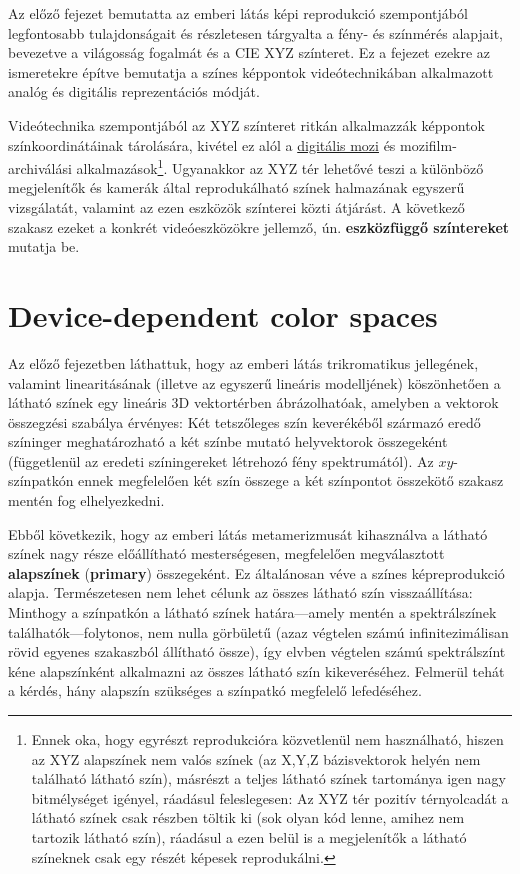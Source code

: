 Az előző fejezet bemutatta az emberi látás képi reprodukció szempontjából legfontosabb tulajdonságait és részletesen tárgyalta a fény- és színmérés alapjait, bevezetve a világosság fogalmát és a CIE XYZ színteret.
Ez a fejezet ezekre az ismeretekre építve bemutatja a színes képpontok videótechnikában alkalmazott analóg és digitális reprezentációs módját.

\vspace{3mm}
Videótechnika szempontjából az XYZ színteret ritkán alkalmazzák képpontok színkoordinátáinak tárolására, kivétel ez alól a \href{https://en.wikipedia.org/wiki/Digital_Cinema_Package}{digitális mozi} és mozifilm-archiválási alkalmazások\footnote{Ennek oka, hogy egyrészt reprodukcióra közvetlenül nem használható, hiszen az XYZ alapszínek nem valós színek (az X,Y,Z bázisvektorok helyén nem található látható szín), másrészt a teljes látható színek tartománya igen nagy bitmélységet igényel, ráadásul feleslegesen:
Az XYZ tér pozitív térnyolcadát a látható színek csak részben töltik ki (sok olyan kód lenne, amihez nem tartozik látható szín), ráadásul a ezen belül is a megjelenítők a látható színeknek csak egy részét képesek reprodukálni.}.
Ugyanakkor az XYZ tér lehetővé teszi a különböző megjelenítők és kamerák által reprodukálható színek halmazának egyszerű vizsgálatát, valamint az ezen eszközök színterei közti átjárást.
A következő szakasz ezeket a konkrét videóeszközökre jellemző, ún. \textbf{eszközfüggő színtereket} mutatja be.

\section{Device-dependent color spaces}

Az előző fejezetben láthattuk, hogy az emberi látás trikromatikus jellegének, valamint linearitásának (illetve az egyszerű lineáris modelljének) köszönhetően a látható színek egy lineáris 3D vektortérben ábrázolhatóak, amelyben a vektorok összegzési szabálya érvényes: 
Két tetszőleges szín keverékéből származó eredő színinger meghatározható a két színbe mutató helyvektorok összegeként (függetlenül az eredeti színingereket létrehozó fény spektrumától).
Az $xy$-színpatkón ennek megfelelően két szín összege a két színpontot összekötő szakasz mentén fog elhelyezkedni.

Ebből következik, hogy az emberi látás metamerizmusát kihasználva a látható színek nagy része előállítható mesterségesen, megfelelően megválasztott \textbf{alapszínek} (\textbf{primary}) összegeként.
Ez általánosan véve a színes képreprodukció alapja.
Természetesen nem lehet célunk az összes látható szín visszaállítása: 
Minthogy a színpatkón a látható színek határa---amely mentén a spektrálszínek találhatók---folytonos, nem nulla görbületű (azaz végtelen számú infinitezimálisan rövid egyenes szakaszból állítható össze), így elvben végtelen számú spektrálszínt kéne alapszínként alkalmazni az összes látható szín kikeveréséhez.
Felmerül tehát a kérdés, hány alapszín szükséges a színpatkó megfelelő lefedéséhez.

